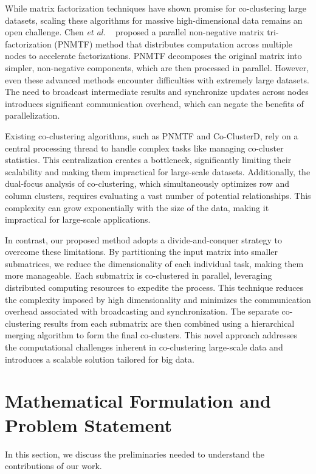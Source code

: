 \documentclass[journal]{IEEEtran}
\renewcommand{\cite}[1]{~\autocite{#1}}
\begin{document}
While matrix factorization techniques have shown promise for co-clustering large datasets, scaling these algorithms for massive high-dimensional data remains an open challenge. Chen \textit{et al.} \cite{chen2023ParallelNonNegativeMatrix} proposed a parallel non-negative matrix tri-factorization (PNMTF) method that distributes computation across multiple nodes to accelerate factorizations. PNMTF decomposes the original matrix into simpler, non-negative components, which are then processed in parallel. However, even these advanced methods encounter difficulties with extremely large datasets. The need to broadcast intermediate results and synchronize updates across nodes introduces significant communication overhead, which can negate the benefits of parallelization.

{Existing co-clustering algorithms, such as PNMTF and Co-ClusterD, rely on a central processing thread to handle complex tasks like managing co-cluster statistics. This centralization creates a bottleneck, significantly limiting their scalability and making them impractical for large-scale datasets. Additionally, the dual-focus analysis of co-clustering, which simultaneously optimizes row and column clusters, requires evaluating a vast number of potential relationships. This complexity can grow exponentially with the size of the data, making it impractical for large-scale applications.}

In contrast, our proposed method adopts a divide-and-conquer strategy to overcome these limitations. By partitioning the input matrix into smaller submatrices, we reduce the dimensionality of each individual task, making them more manageable. Each submatrix is co-clustered in parallel, leveraging distributed computing resources to expedite the process. This technique reduces the complexity imposed by high dimensionality and minimizes the communication overhead associated with broadcasting and synchronization. The separate co-clustering results from each submatrix are then combined using a hierarchical merging algorithm to form the final co-clusters. This novel approach addresses the computational challenges inherent in co-clustering large-scale data and introduces a scalable solution tailored for big data.

\section{Mathematical Formulation and Problem Statement}\label{sec:formula}

In this section, we discuss the preliminaries needed to understand the contributions of our work.
\end{document}

